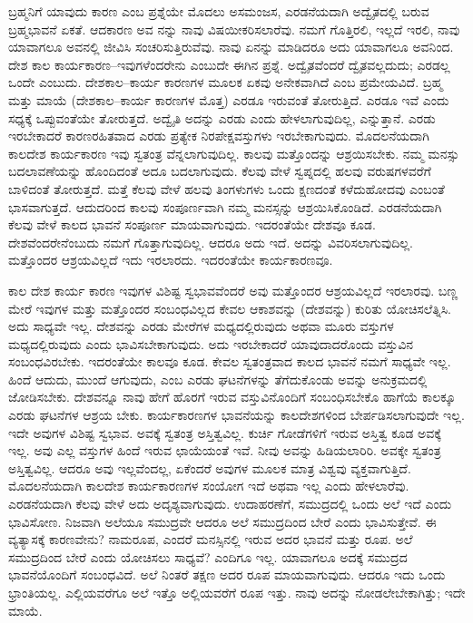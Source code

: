 ಬ್ರಹ್ಮನಿಗೆ ಯಾವುದು ಕಾರಣ ಎಂಬ ಪ್ರಶ್ನೆಯೇ ಮೊದಲು ಅಸಮಂಜಸ, ಎರಡನೆಯದಾಗಿ ಅದ್ವೈತದಲ್ಲಿ ಬರುವ ಬ್ರಹ್ಮಭಾವನೆ ಏಕತೆ. ಆದಕಾರಣ ಅವ ನನ್ನು ನಾವು ವಿಷಯೀಕರಿಸಲಾರೆವು. ನಮಗೆ ಗೊತ್ತಿರಲಿ, ಇಲ್ಲದೆ ಇರಲಿ, ನಾವು ಯಾವಾಗಲೂ ಅವನಲ್ಲಿ ಜೀವಿಸಿ ಸಂಚರಿಸುತ್ತಿರುವೆವು. ನಾವು ಏನನ್ನು ಮಾಡಿದರೂ ಅದು ಯಾವಾಗಲೂ ಅವನಿಂದ. ದೇಶ ಕಾಲ ಕಾರ್ಯಕಾರಣ–ಇವುಗಳೆಂದರೇನು ಎಂಬುದೇ ಈಗಿನ ಪ್ರಶ್ನೆ. ಅದ್ವೈತವೆಂದರೆ ದ್ವೈತವಲ್ಲದುದು; ಎರಡಲ್ಲ ಒಂದೇ ಎಂಬುದು. ದೇಶಕಾಲ–ಕಾರ್ಯ ಕಾರಣಗಳ ಮೂಲಕ ಏಕವು ಅನೇಕವಾಗಿದೆ ಎಂಬ ಪ್ರಮೇಯವಿದೆ. ಬ್ರಹ್ಮ ಮತ್ತು ಮಾಯೆ (ದೇಶಕಾಲ–ಕಾರ್ಯ ಕಾರಣಗಳ ಮೊತ್ತ) ಎರಡೂ ಇರುವಂತೆ ತೋರುತ್ತಿದೆ. ಎರಡೂ ಇವೆ ಎಂದು ಸಧ್ಯಕ್ಕೆ ಒಪ್ಪುವಂತೆಯೇ ತೋರುತ್ತದೆ. ಅದ್ವೈತಿ ಅದನ್ನು ಎರಡು ಎಂದು ಹೇಳಲಾಗುವುದಿಲ್ಲ, ಎನ್ನುತ್ತಾನೆ. ಎರಡು ಇರಬೇಕಾದರೆ ಕಾರಣರಹಿತವಾದ ಎರಡು ಪ್ರತ್ಯೇಕ ನಿರಪೇಕ್ಷವಸ್ತುಗಳು ಇರಬೇಕಾಗುವುದು. ಮೊದಲನೆಯದಾಗಿ ಕಾಲದೇಶ ಕಾರ್ಯಕಾರಣ ಇವು ಸ್ವತಂತ್ರ ವೆನ್ನಲಾಗುವುದಿಲ್ಲ. ಕಾಲವು ಮತ್ತೊಂದನ್ನು ಆಶ್ರಯಿಸಬೇಕು. ನಮ್ಮ ಮನಸ್ಸು ಬದಲಾವಣೆಯನ್ನು ಹೊಂದಿದಂತೆ ಅದೂ ಬದಲಾಗುವುದು. ಕೆಲವು ವೇಳೆ ಸ್ವಪ್ನದಲ್ಲಿ ಹಲವು ವರುಷಗಳವರೆಗೆ ಬಾಳಿದಂತೆ ತೋರುತ್ತದೆ. ಮತ್ತೆ ಕೆಲವು ವೇಳೆ ಹಲವು ತಿಂಗಳುಗಳು ಒಂದು ಕ್ಷಣದಂತೆ ಕಳೆದುಹೋದವು ಎಂಬಂತೆ ಭಾಸವಾಗುತ್ತದೆ. ಆದುದರಿಂದ ಕಾಲವು ಸಂಪೂರ್ಣವಾಗಿ ನಮ್ಮ ಮನಸ್ಸನ್ನು ಆಶ್ರಯಿಸಿಕೊಂಡಿದೆ. ಎರಡನೆಯದಾಗಿ ಕೆಲವು ವೇಳೆ ಕಾಲದ ಭಾವನೆ ಸಂಪೂರ್ಣ ಮಾಯವಾಗುವುದು. ಇದರಂತೆಯೇ ದೇಶವೂ ಕೂಡ. ದೇಶವೆಂದರೇನೆಂಬುದು ನಮಗೆ ಗೊತ್ತಾಗುವುದಿಲ್ಲ. ಆದರೂ ಅದು ಇದೆ. ಅದನ್ನು ವಿವರಿಸಲಾಗುವುದಿಲ್ಲ. ಮತ್ತೊಂದರ ಆಶ್ರಯವಿಲ್ಲದೆ ಇದು ಇರಲಾರದು. ಇದರಂತೆಯೇ ಕಾರ್ಯಕಾರಣವೂ.

ಕಾಲ ದೇಶ ಕಾರ್ಯ ಕಾರಣ ಇವುಗಳ ವಿಶಿಷ್ಟ ಸ್ವಭಾವವೆಂದರೆ ಅವು ಮತ್ತೊಂದರ ಆಶ್ರಯವಿಲ್ಲದೆ ಇರಲಾರವು. ಬಣ್ಣ ಮೇರೆ ಇವುಗಳ ಮತ್ತು ಮತ್ತೊಂದರ ಸಂಬಂಧವಿಲ್ಲದ ಕೇವಲ ಆಕಾಶವನ್ನು (ದೇಶವನ್ನು) ಕುರಿತು ಯೋಚಿಸಲೆತ್ನಿಸಿ. ಅದು ಸಾಧ್ಯವೇ ಇಲ್ಲ. ದೇಶವನ್ನು ಎರಡು ಮೇರೆಗಳ ಮಧ್ಯದಲ್ಲಿರುವುದು ಅಥವಾ ಮೂರು ವಸ್ತುಗಳ ಮಧ್ಯದಲ್ಲಿರುವುದು ಎಂದು ಭಾವಿಸಬೇಕಾಗುವುದು. ಅದು ಇರಬೇಕಾದರೆ ಯಾವುದಾದರೊಂದು ವಸ್ತುವಿನ ಸಂಬಂಧವಿರಬೇಕು. ಇದರಂತೆಯೇ ಕಾಲವೂ ಕೂಡ. ಕೇವಲ ಸ್ವತಂತ್ರವಾದ ಕಾಲದ ಭಾವನೆ ನಮಗೆ ಸಾಧ್ಯವೇ ಇಲ್ಲ. ಹಿಂದೆ ಆದುದು, ಮುಂದೆ ಆಗುವುದು, ಎಂಬ ಎರಡು ಘಟನೆಗಳನ್ನು ತೆಗೆದುಕೊಂಡು ಅವನ್ನು ಅನುಕ್ರಮದಲ್ಲಿ ಜೋಡಿಸಬೇಕು. ದೇಶವನ್ನೂ ನಾವು ಹೇಗೆ ಹೊರಗೆ ಇರುವ ವಸ್ತುವಿನೊಂದಿಗೆ ಸಂಬಂಧಿಸಬೇಕೊ ಹಾಗೆಯೆ ಕಾಲಕ್ಕೂ ಎರಡು ಘಟನೆಗಳ ಆಶ್ರಯ ಬೇಕು. ಕಾರ್ಯಕಾರಣಗಳ ಭಾವನೆಯನ್ನು ಕಾಲದೇಶಗಳಿಂದ ಬೇರ್ಪಡಿಸಲಾಗುವುದೇ ಇಲ್ಲ. ಇದೇ ಅವುಗಳ ವಿಶಿಷ್ಟ ಸ್ವಭಾವ. ಅವಕ್ಕೆ ಸ್ವತಂತ್ರ ಅಸ್ತಿತ್ವವಿಲ್ಲ. ಕುರ್ಚಿ ಗೋಡೆಗಳಿಗೆ ಇರುವ ಅಸ್ತಿತ್ವ ಕೂಡ ಅವಕ್ಕೆ ಇಲ್ಲ. ಅವು ಎಲ್ಲ ವಸ್ತುಗಳ ಹಿಂದೆ ಇರುವ ಛಾಯೆಯಂತೆ ಇವೆ. ನೀವು ಅವನ್ನು ಹಿಡಿಯಲಾರಿರಿ. ಅವಕ್ಕೇ ಸ್ವತಂತ್ರ ಅಸ್ತಿತ್ವವಿಲ್ಲ. ಆದರೂ ಅವು ಇಲ್ಲವೆಂದಲ್ಲ, ಏಕೆಂದರೆ ಅವುಗಳ ಮೂಲಕ ಮಾತ್ರ ವಿಶ್ವವು ವ್ಯಕ್ತವಾಗುತ್ತಿದೆ. ಮೊದಲನೆಯದಾಗಿ ಕಾಲದೇಶ ಕಾರ್ಯಕಾರಣಗಳ ಸಂಯೋಗ ಇದೆ ಅಥವಾ ಇಲ್ಲ ಎಂದು ಹೇಳಲಾರೆವು. ಎರಡನೆಯದಾಗಿ ಕೆಲವು ವೇಳೆ ಅದು ಅದೃಶ್ಯವಾಗುವುದು. ಉದಾಹರಣೆಗೆ, ಸಮುದ್ರದಲ್ಲಿ ಒಂದು ಅಲೆ ಇದೆ ಎಂದು ಭಾವಿಸೋಣ. ನಿಜವಾಗಿ ಅಲೆಯೂ ಸಮುದ್ರವೇ ಆದರೂ ಅಲೆ ಸಮುದ್ರದಿಂದ ಬೇರೆ ಎಂದು ಭಾವಿಸುತ್ತೇವೆ. ಈ ವ್ಯತ್ಯಾಸಕ್ಕೆ ಕಾರಣವೇನು? ನಾಮರೂಪ, ಎಂದರೆ ಮನಸ್ಸಿನಲ್ಲಿ ಇರುವ ಅದರ ಭಾವನೆ ಮತ್ತು ರೂಪ. ಅಲೆ ಸಮುದ್ರದಿಂದ ಬೇರೆ ಎಂದು ಯೋಚಿಸಲು ಸಾಧ್ಯವೆ? ಎಂದಿಗೂ ಇಲ್ಲ. ಯಾವಾಗಲೂ ಅದಕ್ಕೆ ಸಮುದ್ರದ ಭಾವನೆಯೊಂದಿಗೆ ಸಂಬಂಧವಿದೆ. ಅಲೆ ನಿಂತರೆ ತಕ್ಷಣ ಅದರ ರೂಪ ಮಾಯವಾಗುವುದು. ಆದರೂ ಇದು ಒಂದು ಭ್ರಾಂತಿಯಲ್ಲ. ಎಲ್ಲಿಯವರೆಗೂ ಅಲೆ ಇತ್ತೊ ಅಲ್ಲಿಯವರೆಗೆ ರೂಪ ಇತ್ತು. ನಾವು ಅದನ್ನು ನೋಡಲೇಬೇಕಾಗಿತ್ತು; ಇದೇ ಮಾಯೆ.

